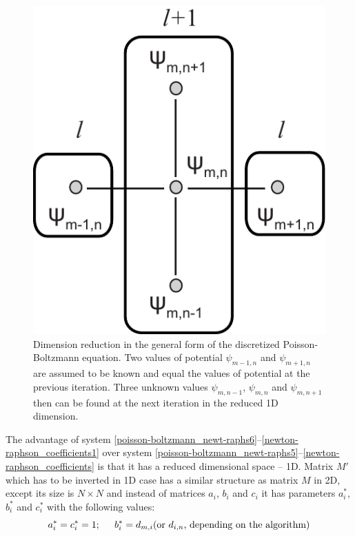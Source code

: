 \begin{figure}[!ht]
\centering
  \includegraphics[scale=0.6]{../figures/scheme1.pdf}

\caption[Dimension reduction in the general form of the discretized Poisson-Boltzmann equation]{Dimension reduction in the general form of the discretized Poisson-Boltzmann equation. Two values of potential $\psi_{m-1,n}$ and $\psi_{m+1,n}$ are assumed to be known and equal the values of potential at the previous iteration. Three unknown values $\psi_{m,n-1}$, $\psi_{m,n}$ and $\psi_{m,n+1}$ then can be found at the next iteration in the reduced 1D dimension.}
\label{fig:computational_scheme1}
\end{figure}

The advantage of system \eqref{poisson-boltzmann_newt-raphs6}--\eqref{newton-raphson_coefficients1} over system \eqref{poisson-boltzmann_newt-raphs5}--\eqref{newton-raphson_coefficients} is that it has a reduced dimensional space -- 1D. Matrix $M'$ which has to be inverted in 1D case has a similar structure as matrix $M$ in 2D, except its size is $N\times N$ and instead of matrices $a_i$, $b_i$ and $c_i$ it has parameters $a^*_i$, $b^*_i$ and $c^*_i$ with the following values:
\begin{equation}
 a^*_i = c^*_i = 1; \hspace{0.2in} b^*_i = d_{m,i} (\text{or } d_{i,n} \text{, depending on the algorithm})
\end{equation}

